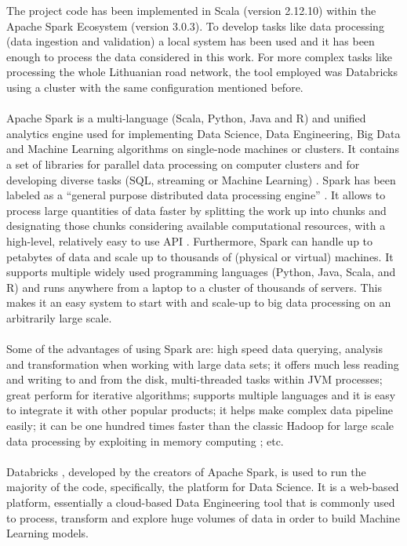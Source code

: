 The project code has been implemented in Scala (version 2.12.10) within the Apache Spark Ecosystem (version 3.0.3). 
To develop tasks like data processing (data ingestion and validation) a local system has been used and it has been enough to process the data considered in this work. For more complex tasks like processing the whole Lithuanian road network, the tool employed was Databricks using a cluster with the same configuration mentioned before. 
\\
\\
Apache Spark \cite{spark} is a multi-language (Scala, Python, Java and R) and unified analytics engine used for implementing Data Science, Data Engineering, Big Data and Machine Learning algorithms on single-node machines or clusters. It contains a set of libraries for parallel data processing on computer clusters and for developing diverse tasks (SQL, streaming or Machine Learning) \cite{spark-guide}. 
Spark has been labeled as a “general purpose distributed data processing engine” \cite{spark}. It allows to process large quantities of data faster by splitting the work up into chunks and designating those chunks considering available computational resources, with a high-level, relatively easy to use API \cite{hihg-spark}. Furthermore, Spark can handle up to petabytes of data and scale up to thousands of (physical or virtual) machines.
It supports multiple widely used programming languages (Python, Java, Scala, and R) and runs anywhere from a laptop to a cluster of thousands of servers. This makes it an easy system to start with and scale-up to big data processing on an arbitrarily large scale.
\\
\\
Some of the advantages of using Spark are: high speed data querying, analysis and transformation when working with large data sets; it offers much less reading and writing to and from the disk, multi-threaded tasks within \ac{JVM} processes; great perform for iterative algorithms; supports multiple languages and it is easy to integrate it with other popular products; it helps make complex data pipeline easily; it can be one hundred times faster than the classic Hadoop for large scale data processing by exploiting in memory computing \cite{spark}; etc.
\\
\\
Databricks \cite{databricks1}, developed by the creators of Apache Spark, is used to run the majority of the code, specifically, the platform for Data Science. It is a web-based platform, essentially a cloud-based Data Engineering tool that is commonly used to process, transform and explore huge volumes of data in order to build Machine Learning models.  
